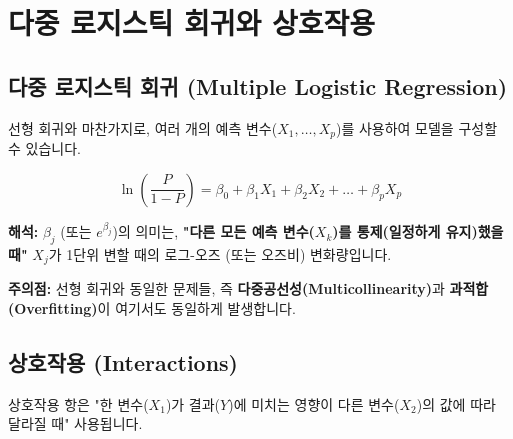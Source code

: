 \documentclass[11pt,a4paper]{book}
\theoremstyle{definition}
\begin{document}
\section{다중 로지스틱 회귀와 상호작용}

\subsection{다중 로지스틱 회귀 (Multiple Logistic Regression)}

선형 회귀와 마찬가지로, 여러 개의 예측 변수($X_1, \dots, X_p$)를 사용하여 모델을 구성할 수 있습니다.

$$ \ln\left(\frac{P}{1-P}\right) = \beta_0 + \beta_1 X_1 + \beta_2 X_2 + \dots + \beta_p X_p $$

\textbf{해석:} $\beta_j$ (또는 $e^{\beta_j}$)의 의미는, \textbf{"다른 모든 예측 변수($X_k$)를 통제(일정하게 유지)했을 때"} $X_j$가 1단위 변할 때의 로그-오즈 (또는 오즈비) 변화량입니다.

\textbf{주의점:} 선형 회귀와 동일한 문제들, 즉 \textbf{다중공선성(Multicollinearity)}과 \textbf{과적합(Overfitting)}이 여기서도 동일하게 발생합니다.

\subsection{상호작용 (Interactions)}

상호작용 항은 "한 변수($X_1$)가 결과($Y$)에 미치는 영향이 다른 변수($X_2$)의 값에 따라 달라질 때" 사용됩니다.
\end{document}
